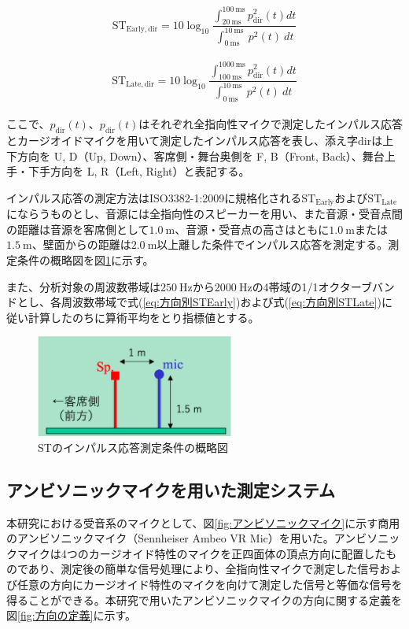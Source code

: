 \documentclass[11pt,a4j]{jreport}
\begin{document}
\begin{equation}
  \label{eq:方向別STEarly}
  \mathrm{ST_{Early,dir}}= 10 \log_{10}
  \frac{\int_{20 \: \mathrm{ms}}^{100 \: \mathrm{ms}} p_{\mathrm{dir}}^2(t) dt}
  {\int_{0 \: \mathrm{ms}}^{10 \: \mathrm{ms}} \: p^2(t) \: dt}
\end{equation}\\
\begin{equation}
  \label{eq:方向別STLate}
  \mathrm{ST_{Late,dir}}= 10 \log_{10}
  \frac{\int_{100 \: \mathrm{ms}}^{1000 \: \mathrm{ms}} p_{\mathrm{dir}}^2(t) dt}
  {\int_{0 \: \mathrm{ms}}^{10 \: \mathrm{ms}} \: p^2(t) \: dt}
\end{equation}\\

ここで、$p_{\mathrm{dir}}(t)$、$p_{\mathrm{dir}}(t)$はそれぞれ全指向性マイクで測定したインパルス応答とカージオイドマイクを用いて測定したインパルス応答を表し、添え字$\mathrm{dir}$は上下方向を U, D（Up, Down）、客席側・舞台奥側を F, B（Front, Back）、舞台上手・下手方向を L, R（Left, Right）と表記する。

インパルス応答の測定方法はISO3382-1:2009に規格化される$\mathrm{ST_{Early}}$および$\mathrm{ST_{Late}}$にならうものとし、音源には全指向性のスピーカーを用い、また音源・受音点間の距離は音源を客席側として$\SI{1.0}{\m}$、音源・受音点の高さはともに$\SI{1.0}{\m}$または$\SI{1.5}{\m}$、壁面からの距離は$\SI{2.0}{\m}$以上離した条件でインパルス応答を測定する。測定条件の概略図を図\ref{fig:STのIR測定条件}に示す。

また、分析対象の周波数帯域は$\SI{250}{\Hz}$から$\SI{2000}{\Hz}$の4帯域の1/1オクターブバンドとし、各周波数帯域で式(\ref{eq:方向別STEarly})および式(\ref{eq:方向別STLate})に従い計算したのちに算術平均をとり指標値とする。

\begin{figure}[H]
  \centering
  \includegraphics[width=6.5cm,clip]{images/howToMeasureST.png}
  \caption{STのインパルス応答測定条件の概略図}
  \label{fig:STのIR測定条件}
\end{figure}

\newpage
\subsection*{アンビソニックマイクを用いた測定システム}
本研究における受音系のマイクとして、図\ref{fig:アンビソニックマイク}に示す商用のアンビソニックマイク（Sennheiser Ambeo VR Mic）を用いた。アンビソニックマイクは4つのカージオイド特性のマイクを正四面体の頂点方向に配置したものであり、測定後の簡単な信号処理により、全指向性マイクで測定した信号および任意の方向にカージオイド特性のマイクを向けて測定した信号と等価な信号を得ることができる\cite{西村竜一2014}。本研究で用いたアンビソニックマイクの方向に関する定義を図\ref{fig:方向の定義}に示す。
\end{document}

